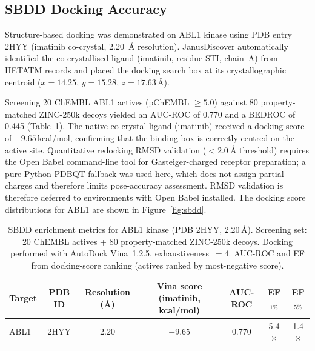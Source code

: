 \documentclass[journal=jcisd8,manuscript=article]{achemso}
\begin{document}
\subsection{SBDD Docking Accuracy}

Structure-based docking was demonstrated on ABL1 kinase using PDB entry
2HYY (imatinib co-crystal, \SI{2.20}{\angstrom} resolution).
JanusDiscover automatically identified the co-crystallised ligand (imatinib,
residue STI, chain~A) from HETATM records and placed the docking search box
at its crystallographic centroid ($x = 14.25$, $y = 15.28$, $z = 17.63$\,\AA{}).

Screening 20 ChEMBL ABL1 actives (pChEMBL $\geq 5.0$) against 80
property-matched ZINC-250k decoys yielded an AUC-ROC of 0.770 and a BEDROC
of 0.445 (Table~\ref{tab:sbdd}).  The native co-crystal ligand (imatinib)
received a docking score of $-9.65$\,kcal/mol, confirming that the binding
box is correctly centred on the active site.  Quantitative redocking RMSD
validation ($< \SI{2.0}{\angstrom}$ threshold) requires the Open Babel
command-line tool for Gasteiger-charged receptor preparation; a pure-Python
PDBQT fallback was used here, which does not assign partial charges and
therefore limits pose-accuracy assessment.  RMSD validation is therefore
deferred to environments with Open Babel installed.
The docking score distributions for ABL1 are shown in Figure~\ref{fig:sbdd}.

\begin{table}[htbp]
  \centering
  \caption{SBDD enrichment metrics for ABL1 kinase (PDB 2HYY, 2.20\,\AA{}).
           Screening set: 20 ChEMBL actives + 80 property-matched ZINC-250k decoys.
           Docking performed with AutoDock Vina~1.2.5, exhaustiveness~$= 4$.
           AUC-ROC and EF from docking-score ranking (actives ranked by
           most-negative score).}
  \label{tab:sbdd}
  \begin{tabular}{lcccccc}
    \toprule
    Target &
    PDB ID &
    Resolution (\AA{}) &
    Vina score (imatinib, kcal/mol) &
    AUC-ROC &
    EF$_{1\%}$ &
    EF$_{5\%}$ \\
    \midrule
    ABL1 &
      2HYY & 2.20 &
      $-9.65$ & 0.770 &
      5.4$\times$ & 1.4$\times$ \\
    \bottomrule
  \end{tabular}
\end{table}

\end{document}
